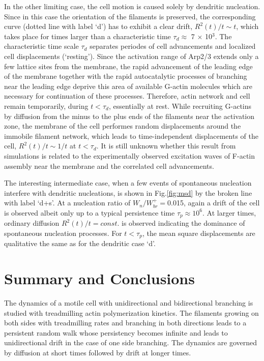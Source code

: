 \documentclass[aps,preprint,pre,array,epsfig,eqsecnum]{revtex4}
\begin{document}
In the other limiting case, the cell motion is caused solely by dendritic 
nucleation. Since in this case the orientation of the filaments is preserved,
the corresponding curve (dotted line with label `d') has to
exhibit a clear drift, $R^2(t)/t \sim t$, which takes place  for
times larger than a characteristic time $\tau_d \approx$ 7 $\times$ 10$^3$. 
%
The characteristic time scale $\tau_d$ separates periodes of cell 
advancements and localized cell displacements (`resting').
%
Since the activation range of Arp2/3 extends only a few lattice sites from
the membrane, the rapid advancement of the leading edge of the membrane  
together with the rapid autocatalytic processes of branching near
the leading edge deprive this area of available G-actin molecules which are
necessary for continuation of these processes.
Therefore, actin network and cell remain temporarily, during $t < \tau_d$,
essentially at rest.
%
While recruiting G-actins by diffusion
from the minus to the plus ends of the filaments near the activation zone, 
the membrane of the cell performes random displacements 
around the immobile filament network, which leads to time-independent
displacements of the cell, $R^2(t)/t \sim 1/t$ at $t < \tau_d$. 
%
It is still unknown whether this result from simulations
is related to the experimentally observed \cite{Vicker00}
excitation waves of F-actin assembly near the membrane and the correlated
cell advancements. 

The interesting intermediate case, when a few events of spontaneous nucleation 
interfere with dendritic nucleations, is shown in Fig.\ref{fig:msd}
by the broken line with label `d+s'.
At a nucleation ratio of $W_n/W_{br}^+ = $0.015, 
again a drift of the cell is observed albeit only up to
a typical persistence time $\tau_p \approx 10^6$.
At larger times, ordinary diffusion $R^2(t)/t = const.$ is observed
indicating the dominance of spontaneous nucleation processes.
For $t < \tau_p$, the mean square displacements are qualitative the same as
for the dendritic case `d'.

\section{Summary and Conclusions}


The dynamics of a motile cell with unidirectional and bidirectional branching
is studied with treadmilling actin polymerization kinetics. The filaments 
growing on both sides with treadmilling rates and branching in both directions
leads to a persistent random walk whose 
persistency becomes infinite and leads to unidirectional drift
in the case of one side branching.
The dynamics are governed by  
diffusion at short times followed by drift at longer times. 
\end{document}
